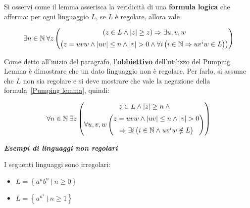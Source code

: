 \documentclass[a4paper]{article}
\begin{document}
	\vspace{2em}
	
	Si osservi come il lemma asserisca la veridicità di una \textbf{formula logica} che afferma: per ogni linguaggio $L$, se $L$ è regolare, allora vale
	
	\begin{equation}\label{Pumping lemma}
		\exists n \in \mathbb{N} \: \forall z
		\left(
		\begin{matrix}
			\left(z \in L \land |z| \ge z\right) \Rightarrow \exists u, v, w \\
			\addlinespace
			\left( z = uvw \land |uv| \le n \land |v| > 0 \land \forall i \left(i \in \mathbb{N} \Rightarrow uv^{i}w \in L\right) \right)
		\end{matrix}
		\right)
	\end{equation}
	
	Come detto all'inizio del paragrafo, l'\textbf{\underline{obbiettivo}} dell'utilizzo del Pumping Lemma è dimostrare che un dato linguaggio non è regolare. Per farlo, si assume che $L$ non sia regolare e si deve mostrare che vale la negazione della formula~\eqref{Pumping lemma}, quindi:
	
	\begin{equation}
		\forall n \in \mathbb{N} \: \exists z
		\left(
		\begin{matrix}
			z \in L \land |z| \ge n \: \land \\
			\addlinespace
			\forall u, v, w
			\left(
			\begin{matrix}
				z = uvw \land |uv| \le n \land |v| > 0 \\
				\addlinespace
				\Rightarrow \exists i \left(i \in \mathbb{N} \land uv^{i}w \notin L \right)
			\end{matrix}
			\right)
		\end{matrix}
		\right)
	\end{equation}\newline
	
	\noindent
	\textcolor{Green4}{\textbf{\emph{Esempi di linguaggi non regolari}}}\newline
	
	\noindent
	I seguenti linguaggi sono irregolari:
	
	\begin{itemize}
		\item $L = \left\{a^{n} b^{n} \: \left| \: n \ge 0 \right.\right\}$
		
		\item $L = \left\{a^{n^{2}} \: \left| \: n \ge 1 \right.\right\}$
	\end{itemize}
\end{document}
